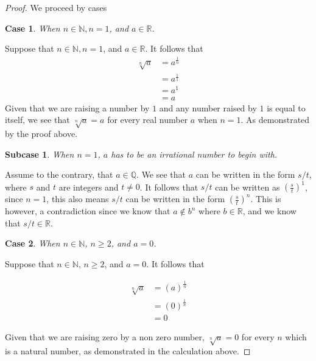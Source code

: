 \documentclass{article}
\newtheorem{case}{Case}
\newtheorem*{subcase*}{Subcase}
\begin{document}
\begin{proof}
    We proceed by cases 

    \begin{case}
        When \(n \in \mathds{N}, n = 1\), and \(a \in \mathds{R}\). 
    \end{case}

Suppose that \(n \in \mathds{N}, n = 1\), and \(a \in \mathds{R}\). It follows that 
    \begin{align*}
        \sqrt[n]{a} &= a^\frac{1}{n} \\ 
                    &= a^\frac{1}{1} \\ 
                    &= a^1 \\ 
                    &= a       
    \end{align*}
Given that we are raising a number by $1$ and any number raised by $1$ is equal to itself, we see that \(\sqrt[n]{a} = a\) for every real number \(a\) when \(n = 1\). As demonstrated by the proof above. 

     \begin{subcase*}
         When \(n = 1\), \(a\) has to be an irrational number to begin with. 
     \end{subcase*} 

Assume to the contrary, that \(a \in \mathds{Q}\). We see that \(a\) can be written in the form \(s/t\), where \(s\) and \(t\) are integers and \(t \neq 0\). It follows that \(s/t\) can be written as \(\left(\frac{s}{t}\right)^1\), since \(n = 1\), this also means \(s/t\) can be written in the form \(\left(\frac{s}{t}\right)^n\).  This is however, a contradiction since we know that \(a \notin b^n\) where \(b \in \mathds{R}\), and we know that \(s/t \in \mathds{R}\).    

    \begin{case}
        When \(n \in \mathds{N}\), \(n \geq 2\), and \(a = 0\). 
    \end{case} 

Suppose that \(n \in \mathds{N}\), \(n \geq 2\), and \(a = 0\). It follows that 

    \begin{align*}
        \sqrt[n]{a} &= (a)^\frac{1}{n} \\ 
                    &= (0)^\frac{1}{n} \\ 
                    &= 0   
    \end{align*}

Given that we are raising zero by a non zero number, \(\sqrt[n]{a} = 0\) for every \(n\) which is a natural number, as demonstrated in the calculation above.        
    

\end{proof}
\end{document}
